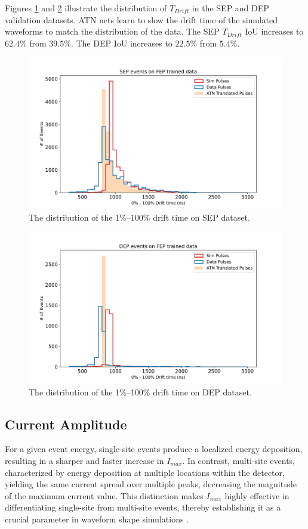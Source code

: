 Figures \ref{fig:drift_times_sep} and \ref{fig:drift_times_dep} illustrate the distribution of $T_{Drift}$ in the SEP and DEP validation datasets. ATN nets learn to slow the drift time of the simulated waveforms to match the distribution of the data.  The SEP $T_{Drift}$ IoU increases to $62.4\%$ from $39.5\%$. The DEP IoU increases to $22.5\%$ from $5.4\%$.
 
\begin{figure}%
\centering
\includegraphics[width=0.9\linewidth,trim={0pc 0pc 0pc 0pc},clip]{ch8/figs/sep_drift_time.pdf}
\caption{The distribution of the 1\%–100\% drift time on SEP dataset.}
\label{fig:drift_times_sep}
\end{figure}

\begin{figure}%
\centering
\includegraphics[width=0.9\linewidth,trim={0pc 0pc 0pc 0pc},clip]{ch8/figs/dep_drift_time.pdf}
\caption{The distribution of the 1\%–100\% drift time on DEP dataset.}
\label{fig:drift_times_dep}
\end{figure}

\subsection{Current Amplitude}
For a given event energy, single-site events produce a localized energy deposition, resulting in a sharper and faster increase in $I_{max}$. In contrast, multi-site events, characterized by energy deposition at multiple locations within the detector, yielding the same current spread over multiple peaks, decreasing the magnitude of the maximum current value. This distinction makes $I_{max}$ highly effective in differentiating single-site from multi-site events, thereby establishing it as a crucial parameter in waveform shape simulations \cite{mjd_psd}.

